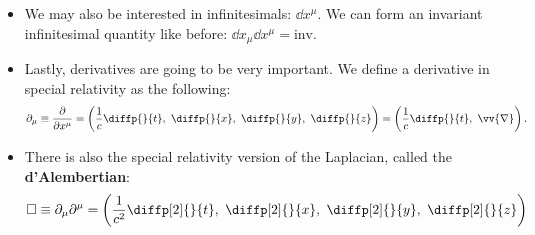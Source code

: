 \begin{itemize}
    \item We may also be interested in infinitesimals: $\dd x^{\mu}$. We can form an invariant infinitesimal quantity like before: $\dd x_{\mu} \dd x^{\mu} = \text{inv.}$
\end{itemize}


\begin{itemize}
    \item Lastly, derivatives are going to be very important. We define a derivative in special relativity as the following:
        \begin{equation}
            \partial_{\mu} \equiv \frac{\partial}{\partial x^{\mu}} = \left(\frac{1}{c}\diffp{}{t},\ \diffp{}{x},\ \diffp{}{y},\ \diffp{}{z}\right) = \left(\frac{1}{c}\diffp{}{t},\ \vv{\nabla}\right).
        \end{equation}
    \item There is also the special relativity version of the Laplacian, called the \textbf{d'Alembertian}:
        \begin{equation}
            \Box \equiv \partial_{\mu}\partial^{\mu} = \left(\frac{1}{c^2} \diffp[2]{}{t},\ \diffp[2]{}{x},\ \diffp[2]{}{y},\ \diffp[2]{}{z}\right)
        \end{equation}
\end{itemize}



